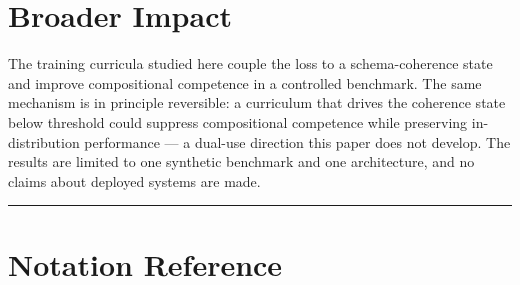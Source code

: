 \documentclass{article}
\theoremstyle{definition}
\begin{document}
\section*{Broader Impact}\label{sec:broader-impact}

The training curricula studied here couple the loss to a
schema-coherence state and improve compositional competence in a
controlled benchmark. The same mechanism is in principle reversible: a
curriculum that drives the coherence state below threshold could
suppress compositional competence while preserving in-distribution
performance --- a dual-use direction this paper does not develop. The
results are limited to one synthetic benchmark and one architecture, and
no claims about deployed systems are made.

\noindent\rule{\linewidth}{0.4pt}

\appendix
\section{Notation Reference}\label{app:notation}
\end{document}
